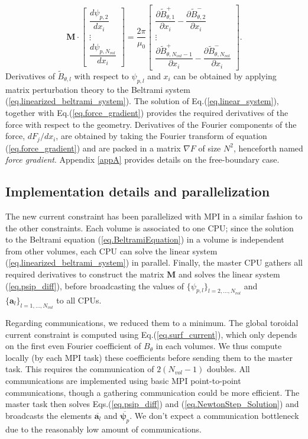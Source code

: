 \begin{equation}
    \mathbf{M} \cdot  \begin{bmatrix}
    \dfrac{d\psi_{p,2}}{dx_i}\\
    \vdots\\
    \dfrac{d\psi_{p,N_{vol}}}{dx_i}
    \end{bmatrix} = \frac{2\pi}{\mu_0}\begin{bmatrix}
    \dfrac{\partial \tilde{B}^+_{\theta,1}}{\partial x_i} - \dfrac{\partial \tilde{B}^-_{\theta,2}}{\partial x_i} \\
    \vdots \\
    \dfrac{\partial \tilde{B}^+_{\theta,N_{vol}-1} } {\partial x_i} - \dfrac{\partial \tilde{B}^-_{\theta,N_{vol}}}{\partial x_i}
    \end{bmatrix}.\label{eq.linear_system}
\end{equation}
Derivatives of $\tilde{B}_{\theta,l}$ with respect to $\psi_{p,l}$ and $x_i$ can be obtained by applying matrix perturbation theory to the Beltrami system (\ref{eq.linearized_beltrami_system}). The solution of Eq.(\ref{eq.linear_system}), together with Eq.(\ref{eq.force_gradient}) provides the required derivatives of the force with respect to the geometry. Derivatives of the Fourier components of the force, $dF_j/dx_i$, are obtained by taking the Fourier transform of equation (\ref{eq.force_gradient}) and are packed in a matrix $\nabla F$ of size $N^2$, henceforth named \textit{force gradient}. Appendix \ref{appA} provides details on the free-boundary case. 

\subsection{Implementation details and parallelization}
The new current constraint has been parallelized with \ac{MPI} in a similar fashion to the other constraints. Each volume is associated to one \ac{CPU}; since the solution to the Beltrami equation (\ref{eq.BeltramiEquation}) in a volume is independent from other volumes, each \ac{CPU} can solve the linear system (\ref{eq.linearized_beltrami_system}) in parallel. Finally, the master \ac{CPU} gathers all required derivatives to construct the matrix $\mathbf{M}$ and solves the linear system (\ref{eq.psip_diff}), before broadcasting the values of $\{\psi_{p,l}\}_{l=2,\ldots,N_{vol}}$ and $\{\mathbf{a}_l\}_{l=1,\ldots,N_{vol}}$ to all \acp{CPU}.

Regarding communications, we reduced them to a minimum. The global toroidal current constraint is computed using Eq.(\ref{eq.surf_current}), which only depends on the first even Fourier coefficient of $B_\theta$ in each volumes. We thus compute locally (by each \ac{MPI} task) these coefficients before sending them to the master task. This requires the communication of $2(N_{vol}-1)$ doubles. All communications are implemented using basic \ac{MPI} point-to-point communications, though a gathering communication could be more efficient. The master task then solves Eqs.(\ref{eq.psip_diff}) and (\ref{eq.NewtonStep_Solution}) and broadcasts the elements $\overbar{\bm{a}_l}$ and $\overbar{\bm{\psi}_p}$. We don't expect a communication bottleneck due to the reasonably low amount of communications. 

